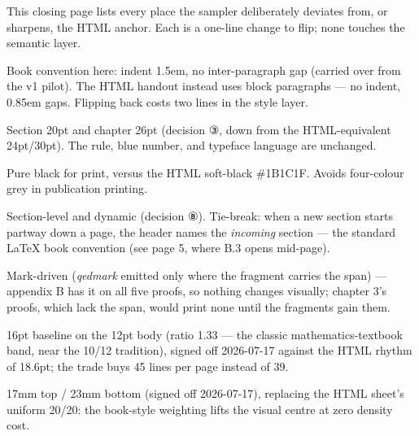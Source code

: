 \documentclass[a4paper,12pt,oneside]{memoir}
\begin{document}

This closing page lists every place the sampler deliberately deviates from, or sharpens, the HTML anchor. Each is a one-line change to flip; none touches the semantic layer.

\begin{steps}
  \item {} Book convention here: indent 1.5em, no inter-paragraph gap (carried over from the v1 pilot). The HTML handout instead uses block paragraphs — no indent, 0.85em gaps. Flipping back costs two lines in the style layer.
  \item {} Section 20pt and chapter 26pt (decision ③, down from the HTML-equivalent 24pt/30pt). The rule, blue number, and typeface language are unchanged.
  \item {} Pure black for print, versus the HTML soft-black \#1B1C1F. Avoids four-colour grey in publication printing.
  \item {} Section-level and dynamic (decision ⑧). Tie-break: when a new section starts partway down a page, the header names the \emph{incoming} section — the standard LaTeX book convention (see page 5, where B.3 opens mid-page).
  \item {} Mark-driven (\emph{qedmark} emitted only where the fragment carries the span) — appendix B has it on all five proofs, so nothing changes visually; chapter 3's proofs, which lack the span, would print none until the fragments gain them.
  \item {} 16pt baseline on the 12pt body (ratio 1.33 — the classic mathematics-textbook band, near the 10/12 tradition), signed off 2026-07-17 against the HTML rhythm of 18.6pt; the trade buys 45 lines per page instead of 39.
  \item {} 17mm top / 23mm bottom (signed off 2026-07-17), replacing the HTML sheet's uniform 20/20: the book-style weighting lifts the visual centre at zero density cost.
\end{steps}
\end{document}
